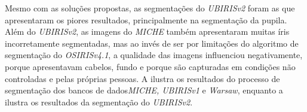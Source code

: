 \par Mesmo com as soluções propostas, as segmentações do \textit{UBIRISv2} foram as que apresentaram os piores resultados, principalmente na segmentação da pupila. Além do \textit{UBIRISv2}, as imagens do \textit{MICHE} também apresentaram muitas íris incorretamente segmentadas, mas ao invés de ser por limitações do algoritmo de segmentação do \textit{OSIRISv4.1}, a qualidade das imagens influenciou negativamente, porque apresentavam cabelos, fundo e porque são capturadas em condições não controladas e pelas próprias pessoas. A  ilustra os resultados do processo de segmentação dos bancos de dados\textit{MICHE, UBIRISv1} e \textit{\acrshort{Warsaw}}, enquanto a  ilustra os resultados da segmentação do \textit{UBIRISv2}.

